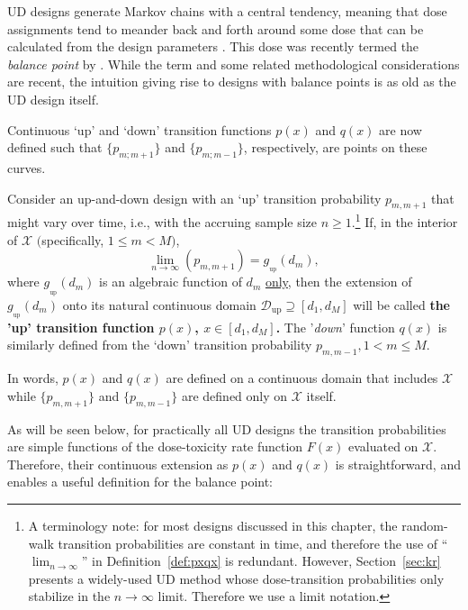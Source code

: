 UD designs generate Markov chains with a central tendency, meaning that dose assignments tend to meander back and forth around some dose that can be calculated from the design parameters \citep{Durh:Flou:rand:1994,Hugh:Rand:1995}. This dose was recently termed the \emph{balance point} by \cite{Oron:Hoff:thek:2009}. While the term and some related methodological considerations are recent, the intuition giving rise to designs with balance points is as old as the UD design itself.

Continuous `up' and `down' transition functions $p(x)$ and $q(x)$ are now defined such that
$\{p_{m;m+1}\}$ and $\{p_{m;m-1}\}$, respectively, are points on these curves.

\begin{defn}\label{def:pxqx}
Consider an up-and-down design with an `up' transition probability  $p_{m,m+1}$ that might vary over time, i.e., with the accruing sample size $n\geq 1$.\footnote{A terminology note: for most designs discussed in this chapter, the random-walk transition probabilities are constant in time, and therefore the use of ``$\lim_{n\to\infty}$'' in Definition~\ref{def:pxqx} is redundant. However, Section~\ref{sec:kr} presents a widely-used UD method whose dose-transition probabilities only stabilize in the $n\to\infty$ limit. Therefore we use a limit notation.} If, in the interior of $\mathcal{X}$ $($specifically, $1\leq m<M)$, $$\lim_{n\to\infty}\left(p_{m,m+1}\right)=g_{_\mathrm{up}}\left(d_m\right),$$
where $g_{_\mathrm{up}}\left(d_m\right)$ is an algebraic function of $d_m$  \underline{only}, then the extension of $g_{_\mathrm{up}}\left(d_m\right)$ onto its natural continuous domain $\mathcal{D}{_\mathrm{up}}\supseteq\left[d_1,d_M\right]$ will be called \textbf{the 'up' transition function $p(x)$, $x\in\left[d_1,d_M\right]$.} The '\emph{down}' function $q(x)$ is similarly defined from the `down' transition probability $p_{m,m-1}, 1<m\leq M$.
\end{defn}

\noindent In words, $p(x)$ and $q(x)$ are defined on a continuous domain that includes $\mathcal{X}$ while $\{p_{m,m+1}\}$ and $\{p_{m,m-1}\}$ are defined only on $\mathcal{X}$ itself.

As will be seen below, for practically all UD designs the transition probabilities are simple functions of the dose-toxicity rate function $F(x)$ evaluated on $\mathcal{X}$. Therefore, their continuous extension as $p(x)$ and $q(x)$ is straightforward, and enables a useful definition for the balance point:

